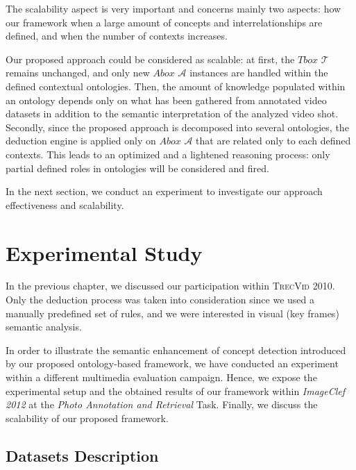 		The scalability aspect is very important and concerns mainly two aspects: 
		how our framework  when a large amount of concepts 
		and interrelationships are defined, and when the number of contexts increases. 

		Our proposed approach could be considered as scalable:
		at first, the $Tbox$ $\mathcal{T}$ remains unchanged, and only new $Abox$ $\mathcal{A}$ 
		instances are  handled within the defined contextual ontologies. Then, the amount of knowledge 
		populated within an ontology depends only on what has been gathered from annotated 
		video datasets in addition to the semantic interpretation of the analyzed video shot. 
		Secondly, since the proposed approach is decomposed into several ontologies, 
		the deduction engine is applied only on $Abox$ $\mathcal{A}$ that are related only to each defined contexts. 
		This leads to an optimized and a lightened reasoning process: only partial 
		defined roles in ontologies will be considered and fired.
		
		In the next section, we conduct an experiment to investigate our approach effectiveness and scalability.
		

		
	\section{Experimental Study}
		\label{c2_3}
		In the previous chapter, we discussed our participation within  \textsc{TrecVid 2010}. 
		Only the deduction process was taken into consideration since we used a manually predefined 
		set of rules, and  we were interested in visual (key frames) semantic analysis. 
		
		In order to illustrate the semantic enhancement of concept detection introduced 
		by our proposed ontology-based framework, we have conducted an experiment within a 
		different multimedia evaluation campaign. Hence, we expose the experimental setup and the 
		obtained results of our framework within \textit{ImageClef 2012} \citep{Thomee2012}
		at the \textit{Photo Annotation and Retrieval} Task. 
		Finally, we discuss the scalability of our proposed framework.


		\subsection{Datasets Description}

